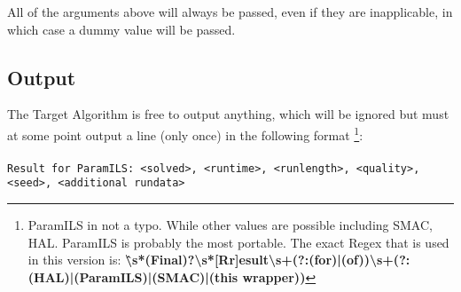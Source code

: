 \documentclass[manual.tex]{subfiles}
\begin{document}
All of the arguments above will always be passed, even if they are inapplicable, in which case a dummy value will be passed.

\subsection{Output}\label{sec:wrapper_output}

The Target Algorithm is free to output anything, which will be ignored
but must at some point output a line (only once) in the following
format%
\footnote{ParamILS in not a typo. While other values are possible including
SMAC, HAL. ParamILS is probably the most portable. The exact Regex
that is used in this version is: \textbf{\^\textbackslash{}s{*}(Final)?\textbackslash{}s{*}{[}Rr{]}esult\textbackslash{}s+(?:(for)|(of))\textbackslash{}s+(?:(HAL)|(ParamILS)|(SMAC)|(this
wrapper))}}:%
\\
\\
\texttt{Result for ParamILS: <solved>, <runtime>, <runlength>, <quality>, <seed>, <additional rundata>} 
\end{document}
